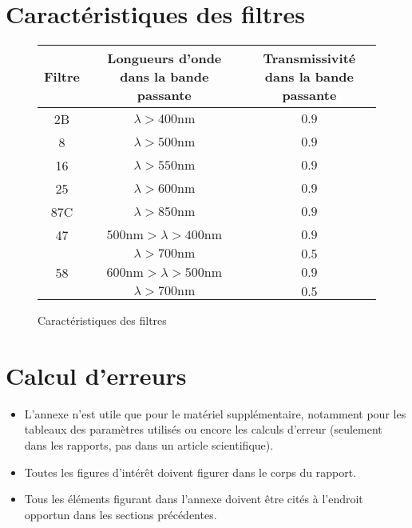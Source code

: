 \section{Caractéristiques des filtres}

\begin{figure}[h]
\centering
\begin{tabulary}{0.7\linewidth}{C C C}
    \toprule
    Filtre & Longueurs d'onde dans la bande passante & Transmissivité dans la bande passante \\
    \midrule
    2B  & $\lambda > 400 \unit{\nano \metre}$ & $0.9$ \\
    8   & $\lambda > 500 \unit{\nano \metre}$ & $0.9$ \\
    16  & $\lambda > 550 \unit{\nano \metre}$ & $0.9$ \\
    25  & $\lambda > 600 \unit{\nano \metre}$ & $0.9$ \\
    87C & $\lambda > 850 \unit{\nano \metre}$ & $0.9$ \\
    47  & $500 \unit{\nano \metre} > \lambda > 400 \unit{\nano \metre}$ & $0.9$ \\
        & $\lambda > 700 \unit{\nano \metre}$ & $0.5$ \\
    58  & $600 \unit{\nano \metre} > \lambda > 500 \unit{\nano \metre}$ & $0.9$ \\
        & $\lambda > 700 \unit{\nano \metre}$ & $0.5$ \\
    \bottomrule
    \end{tabulary}
    \caption{Caractéristiques des filtres \cite{notice}}
    \label{tab:filters}
\end{figure}

\section{Calcul d'erreurs}

\begin{itemize}
\item L'annexe n'est utile que pour le matériel supplémentaire, notamment pour les tableaux des paramètres utilisés ou encore les calculs d'erreur (seulement dans les rapports, pas dans un article scientifique).
\item Toutes les figures d'intérêt doivent figurer dans le corps du rapport.
\item Tous les éléments figurant dans l'annexe doivent être cités à l'endroit opportun dans les sections précédentes.
\end{itemize}

